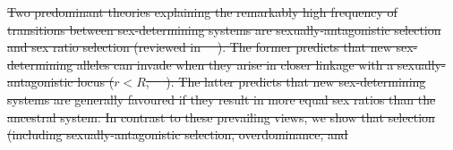 \documentclass[10pt,letterpaper]{article}
\providecommand{\DIFaddtex}[1]{{\protect\color{blue}\uwave{#1}}} %
\providecommand{\DIFdeltex}[1]{{\protect\color{red}\sout{#1}}}                      %
\providecommand{\DIFaddbegin}{} %
\providecommand{\DIFdelbegin}{} %
\providecommand{\DIFdelend}{} %
\providecommand{\DIFadd}[1]{\texorpdfstring{\DIFaddtex{#1}}{#1}} %
\providecommand{\DIFdel}[1]{\texorpdfstring{\DIFdeltex{#1}}{}} %
\newcommand{\DIFscaledelfig}{0.5}
\newlength{\DIFdelgraphicswidth} %
\newlength{\DIFdelgraphicsheight} %
\newcommand{\DIFaddincludegraphics}[2][]{{\color{blue}\fbox{\DIFOincludegraphics[#1]{#2}}}} %
\newcommand{\DIFdelincludegraphics}[2][]{%
\sbox{\DIFdelgraphicsbox}{\DIFOincludegraphics[#1]{#2}}%
\settoboxwidth{\DIFdelgraphicswidth}{\DIFdelgraphicsbox} %
\settoboxtotalheight{\DIFdelgraphicsheight}{\DIFdelgraphicsbox} %
\scalebox{\DIFscaledelfig}{%
\parbox[b]{\DIFdelgraphicswidth}{\usebox{\DIFdelgraphicsbox}\\[-\baselineskip] \rule{\DIFdelgraphicswidth}{0em}}\llap{\resizebox{\DIFdelgraphicswidth}{\DIFdelgraphicsheight}{%
\setlength{\unitlength}{\DIFdelgraphicswidth}%
\begin{picture}(1,1)%
\thicklines\linethickness{2pt} %
{\color[rgb]{1,0,0}\put(0,0){\framebox(1,1){}}}%
{\color[rgb]{1,0,0}\put(0,0){\line( 1,1){1}}}%
{\color[rgb]{1,0,0}\put(0,1){\line(1,-1){1}}}%
\end{picture}%
}\hspace*{3pt}}} %
} %
\DeclareRobustCommand{\DIFaddbegin}{\DIFOaddbegin \let\includegraphics\DIFaddincludegraphics} %
\DeclareRobustCommand{\DIFdelbegin}{\DIFOdelbegin \let\includegraphics\DIFdelincludegraphics} %
\DeclareRobustCommand{\DIFdelend}{\DIFOaddend \let\includegraphics\DIFOincludegraphics} %
\begin{document}

\DIFdelbegin \DIFdel{Two predominant theories explaining the remarkably high frequency of transitions between sex-determining systems are sexually-antagonistic selection and sex ratio selection (reviewed in~\mbox{%
\cite{Blaser2012, vanDoorn2014re}}%
).
The former predicts that new sex-determining alleles can invade when they arise in closer linkage with a sexually-antagonistic locus ($r<R$,~\mbox{%
\cite{vanDoorn:2007eu,vanDoorn:2010hu, Muralidhar2018}}%
).
The latter predicts that new sex-determining systems are generally favoured if they result in more equal sex ratios than the ancestral system.
In contrast to these prevailing views, we show that selection (including sexually-antagonistic selection, overdominance, and}\DIFdelend \DIFaddbegin \section*{\DIFadd{Discussion}}
\end{document}
